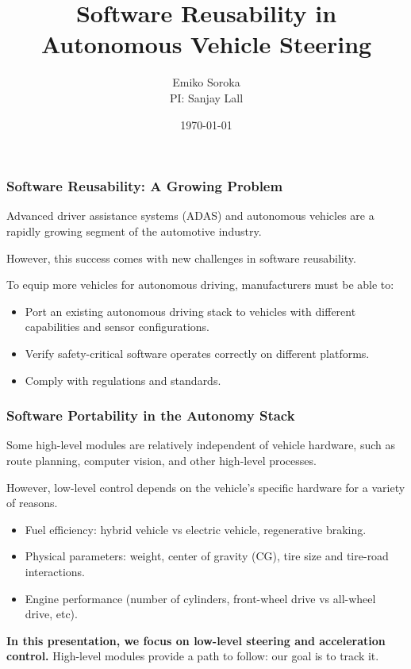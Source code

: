 \documentclass{beamer}
\title{Software Reusability in Autonomous Vehicle Steering}
\author{Emiko Soroka\\PI: Sanjay Lall}
\institute{Stanford University}
\date{\today}
\begin{document}
	
	\frame{\titlepage}
	
\begin{frame}
\frametitle{Software Reusability: A Growing Problem}
Advanced driver assistance systems (ADAS) and autonomous vehicles are a rapidly growing segment of the automotive industry.

However, this success comes with new challenges in software reusability.

To equip more vehicles for autonomous driving, manufacturers must be able to:
\begin{itemize}
	\item Port an existing autonomous driving stack to vehicles with different capabilities and sensor configurations.
	\item Verify safety-critical software operates correctly on different platforms.
	\item Comply with regulations and standards.
\end{itemize}
\end{frame}

\begin{frame}
\frametitle{Software Portability in the Autonomy Stack}
Some high-level modules are relatively independent of vehicle hardware, such as route planning, computer vision, and other high-level processes.

However, low-level control depends on the vehicle's specific hardware for a variety of reasons.
\begin{itemize}
	\item Fuel efficiency: hybrid vehicle vs electric vehicle, regenerative braking.
	\item Physical parameters: weight, center of gravity (CG), tire size and tire-road interactions.
	\item Engine performance (number of cylinders, front-wheel drive vs all-wheel drive, etc).
\end{itemize}
\textbf{In this presentation, we focus on low-level steering and acceleration control.} High-level modules provide a path to follow: our goal is to track it.
\end{frame}
\end{document}
